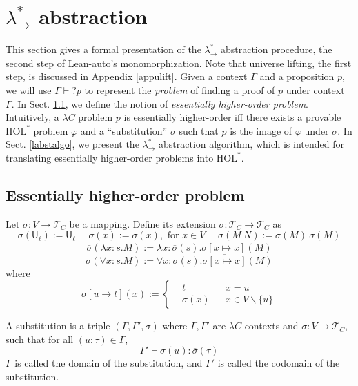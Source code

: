 \section{$\lambda_\to^*$ abstraction}\label{sectabst}

This section gives a formal presentation of the $\lambda_\to^*$ abstraction procedure,
the second step of Lean-auto's monomorphization. Note that universe lifting, the first step,
is discussed in Appendix \ref{appulift}. 
Given a context $\Gamma$ and a proposition $p$, we will use $\Gamma \vdash? p$ to
represent the \emph{problem} of finding a proof of $p$ under context $\Gamma$.
In Sect. \ref{fmehop}, we define the notion of \textit{essentially higher-order problem}.
Intuitively, a $\lambda C$ problem $p$ is essentially higher-order iff there exists
a provable $\text{HOL}^*$ problem $\varphi$ and a ``substitution'' $\sigma$ such that $p$ is the
image of $\varphi$ under $\sigma$. In Sect. \ref{labstalgo}, we present the
$\lambda_\to^*$ abstraction algorithm, which is intended for translating essentially
higher-order problems into $\text{HOL}^*$.

\subsection{Essentially higher-order problem}\label{fmehop}

\begin{definition} Let $\sigma : V \to \mathcal{T}_C$ be a mapping.
  Define its extension $\overline{\sigma} : \mathcal{T}_C \to \mathcal{T}_C$ as
  $$\overline{\sigma}(\mathsf{U}_\ell) := \mathsf{U}_\ell \ \ \ \ \ \
    \overline{\sigma}(x) := \sigma(x), \text{ for }x \in V \ \ \ \ \ \
    \overline{\sigma}(M \ N) := \overline{\sigma}(M) \ \overline{\sigma}(M)$$
  $$\overline{\sigma}(\lambda x : s. M) := \lambda x : \overline{\sigma}(s). \overline{\sigma[x \mapsto x]}(M)$$
  $$\overline{\sigma}(\forall x : s. M) := \forall x : \overline{\sigma}(s). \overline{\sigma[x \mapsto x]}(M)$$
  where
  $$\sigma[u \to t](x) := \left\{\begin{aligned}
    & t & & x = u \\
    & \sigma(x) & & x \in V \backslash \{u\}
  \end{aligned}\right.$$
\end{definition}

\begin{definition}
  A substitution is a triple $(\Gamma, \Gamma', \sigma)$ where $\Gamma, \Gamma'$ are $\lambda C$ contexts
  and $\sigma : V \to \mathcal{T}_C$, such that for all $(u : \tau) \in \Gamma$,
  $$\Gamma' \vdash \sigma(u) : \overline{\sigma}(\tau)$$
  $\Gamma$ is called the domain of the substitution, and $\Gamma'$ is called the codomain of the substitution.
\end{definition}

